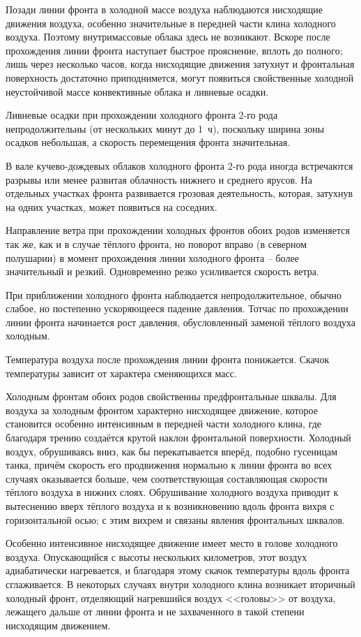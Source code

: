 \documentclass[a4paper, 12pt, twoside, final, book, russian, fittopage, cyremdash, openright]{ncc}
\begin{document}
Позади линии фронта в холодной массе воздуха наблюдаются нисходящие
движения воздуха, особенно значительные в передней части клина
холодного воздуха. Поэтому внутримассовые облака здесь не
возникают. Вскоре после прохождения линии фронта наступает быстрое
прояснение, вплоть до полного; лишь через несколько часов, когда
нисходящие движения затухнут и фронтальная поверхность достаточно
приподнимется, могут появиться свойственные холодной неустойчивой
массе конвективные облака и ливневые осадки.

Ливневые осадки при прохождении холодного фронта 2-го рода
непродолжительны (от нескольких минут до 1~ч), поскольку ширина зоны
осадков небольшая, а скорость перемещения фронта значительная.

В вале кучево-дождевых облаков холодного фронта 2-го рода иногда
встречаются разрывы или менее развитая облачность нижнего и среднего
ярусов. На отдельных участках фронта развивается грозовая
деятельность, которая, затухнув на одних участках, может появиться на
соседних.

Направление ветра при прохождении холодных фронтов обоих родов
изменяется так же, как и в случае тёплого фронта, но поворот вправо
(в северном полушарии) в момент прохождения линии холодного фронта \---
более значительный и резкий. Одновременно резко усиливается скорость
ветра.

При приближении холодного фронта наблюдается непродолжительное,
обычно слабое, но постепенно ускоряющееся падение давления. Тотчас по
прохождении линии фронта начинается рост давления, обусловленный
заменой тёплого воздуха холодным.

Температура воздуха после прохождения линии фронта понижается. Скачок
температуры зависит от характера сменяющихся масс.

Холодным фронтам обоих родов свойственны предфронтальные шквалы. Для
воздуха за холодным фронтом характерно нисходящее движение, которое
становится особенно интенсивным в передней части холодного клина, где
благодаря трению создаётся крутой наклон фронтальной
поверхности. Холодный воздух, обрушиваясь вниз, как бы перекатывается
вперёд, подобно гусеницам танка, причём скорость его продвижения
нормально к линии фронта во всех случаях оказывается больше, чем
соответствующая составляющая скорости тёплого воздуха в нижних
слоях. Обрушивание холодного воздуха приводит к вытеснению вверх
тёплого воздуха и к возникновению вдоль фронта вихря с горизонтальной
осью; с этим вихрем и связаны явления фронтальных шквалов.

Особенно интенсивное нисходящее движение имеет место в голове
холодного воздуха. Опускающийся с высоты нескольких километров, этот
воздух адиабатически нагревается, и благодаря этому скачок температуры
вдоль фронта сглаживается. В некоторых случаях внутри холодного клина
возникает вторичный холодный фронт, отделяющий нагревшийся воздух
<<головы>> от воздуха, лежащего дальше от линии фронта и не
захваченного в такой степени нисходящим движением.
\end{document}
